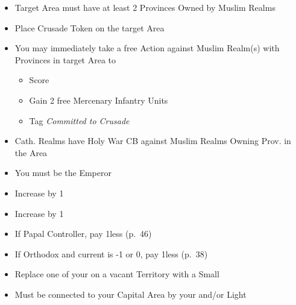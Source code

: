 \documentclass[10pt]{article}
\begin{document}
\begin{itemize}
	\item Target Area must have at least 2 Provinces Owned by Muslim Realms
	\item Place Crusade Token on the target Area
	\item You may immediately take a free  Action against Muslim Realm(s) with Provinces in target Area to
	\begin{itemize}
		\item Score 
		\item Gain 2 free Mercenary Infantry Units
		\item Tag \emph{Committed to Crusade}
	\end{itemize}
	\item Cath. Realms have Holy War CB against Muslim Realms Owning Prov. in the Area	
\end{itemize}

\begin{itemize}
	\item You must be the Emperor
	\item Increase \authority by 1
\end{itemize}

\begin{itemize}
	\item Increase \stability by 1
	\item If Papal Controller, pay 1\adminpower less (p.~46)
	\item If Orthodox and current \stability is -1 or 0, pay 1\adminpower less (p.~38)
\end{itemize}

\begin{itemize}
	\item Replace one of your \claims on a vacant Territory with a Small \town
	\item Must be connected to your Capital Area by your \towns and/or Light \ships
\end{itemize}
\end{document}
